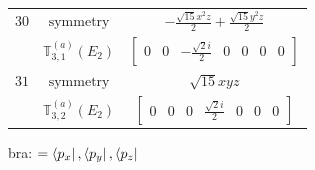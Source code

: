 \documentclass[fleqn,8pt,landscape]{jsarticle}
\begin{document}
\begin{longtable}{ccc}
$ 30 $ & $ \text{symmetry} $ & $ - \frac{\sqrt{15} x^{2} z}{2} + \frac{\sqrt{15} y^{2} z}{2} $ \\
$  $ & $ \mathbb{T}_{3,1}^{(a)}(E_{2}) $ & $ \begin{bmatrix} 0 & 0 & - \frac{\sqrt{2} i}{2} & 0 & 0 & 0 & 0 \end{bmatrix} $ \\ \hline
$ 31 $ & $ \text{symmetry} $ & $ \sqrt{15} x y z $ \\
$  $ & $ \mathbb{T}_{3,2}^{(a)}(E_{2}) $ & $ \begin{bmatrix} 0 & 0 & 0 & \frac{\sqrt{2} i}{2} & 0 & 0 & 0 \end{bmatrix} $ \\ \hline
\end{longtable}
bra: $=\bra{p_{x}}, \bra{p_{y}}, \bra{p_{z}}$
\end{document}
